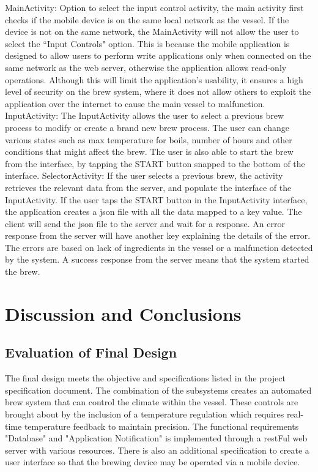 \documentclass{article}
\begin{document}
MainActivity: Option to select the input control activity, the main activity first checks if the mobile device is on the same local network as the vessel. If the device is not on the same network, the MainActivity will not allow the user to select the ``Input Controls" option. This is because the mobile application is designed to allow users to perform write applications only when connected on the same network as the web server, otherwise the application allows read-only operations. Although this will limit the application's usability, it ensures a high level of security on the brew system, where it does not allow others to exploit the application over the internet to cause the main vessel to malfunction. 
InputActivity: The InputActivity allows the user to select a previous brew process to modify or create a brand new brew process. The user can change various states such as max temperature for boils, number of hours and other conditions that might affect the brew. The user is also able to start the brew from the interface, by tapping the START button snapped to the bottom of the interface.
SelectorActivity: If the user selects a previous brew, the activity retrieves the relevant data from the server, and populate the interface of the InputActivity.
If the user taps the START button in the InputActivity interface, the application creates a \gls{json} file with all the data mapped to a key value. The client will send the \gls{json} file to the server and wait for a response. An error response from the server will have another key explaining the details of the error. The errors are based on lack of ingredients in the vessel or a malfunction detected by the system. A success response from the server means that the system started the brew.

\section{Discussion and Conclusions}
\subsection{Evaluation of Final Design}
The final design meets the objective and specifications listed in the project specification document. The combination of the subsystems creates an automated brew system that can control the climate within the vessel.  These controls are brought about by the inclusion of a temperature regulation which requires real-time temperature feedback to maintain precision. The functional requirements "Database" and "Application Notification" is implemented through a \gls{rest}Ful web server with various resources. There is also an additional specification to create a user interface so that the brewing device may be operated via a mobile device. 
\end{document}
